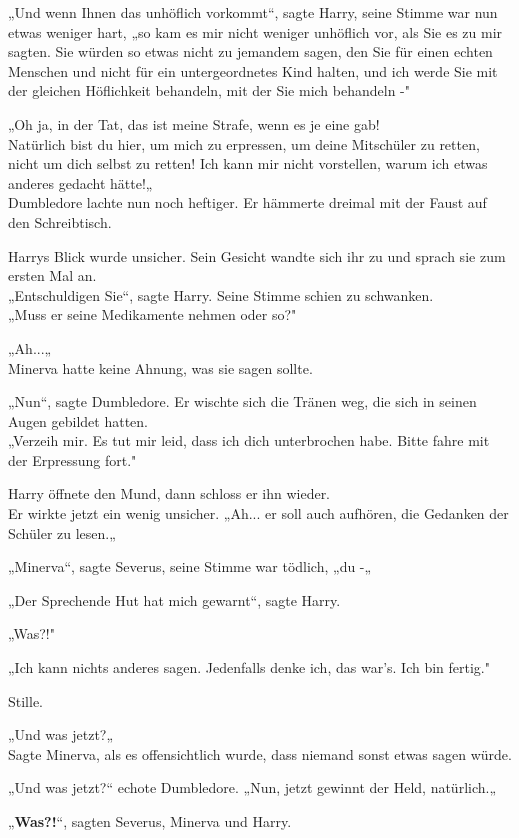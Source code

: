 {„Und wenn Ihnen das unhöflich vorkommt“, sagte Harry, seine Stimme war nun etwas weniger hart, „so kam es mir nicht weniger unhöflich vor, als Sie es zu mir sagten. Sie würden so etwas nicht zu jemandem sagen, den Sie für einen echten Menschen und nicht für ein untergeordnetes Kind halten, und ich werde Sie mit der gleichen Höflichkeit behandeln, mit der Sie mich behandeln -"

„Oh ja, in der Tat, das ist meine Strafe, wenn es je eine gab!\\ Natürlich bist du hier, um mich zu erpressen, um deine Mitschüler zu retten, nicht um dich selbst zu retten! Ich kann mir nicht vorstellen, warum ich etwas anderes gedacht hätte!„\\ Dumbledore lachte nun noch heftiger. Er hämmerte dreimal mit der Faust auf den Schreibtisch.

Harrys Blick wurde unsicher. Sein Gesicht wandte sich ihr zu und sprach sie zum ersten Mal an.\\ „Entschuldigen Sie“, sagte Harry. Seine Stimme schien zu schwanken.\\ „Muss er seine Medikamente nehmen oder so?"

„Ah...„\\ Minerva hatte keine Ahnung, was sie sagen sollte.

„Nun“, sagte Dumbledore. Er wischte sich die Tränen weg, die sich in seinen Augen gebildet hatten.\\ „Verzeih mir. Es tut mir leid, dass ich dich unterbrochen habe. Bitte fahre mit der Erpressung fort."

Harry öffnete den Mund, dann schloss er ihn wieder.\\ Er wirkte jetzt ein wenig unsicher. „Ah... er soll auch aufhören, die Gedanken der Schüler zu lesen.„

„Minerva“, sagte Severus, seine Stimme war tödlich, „du -„

„Der Sprechende Hut hat mich gewarnt“, sagte Harry.

„Was?!"

„Ich kann nichts anderes sagen. Jedenfalls denke ich, das war's. Ich bin fertig."

Stille.

„Und was jetzt?„\\ Sagte Minerva, als es offensichtlich wurde, dass niemand sonst etwas sagen würde.

„Und was jetzt?“ echote Dumbledore. „Nun, jetzt gewinnt der Held, natürlich.„

„\textbf{Was?!}“, sagten Severus, Minerva und Harry.

}
